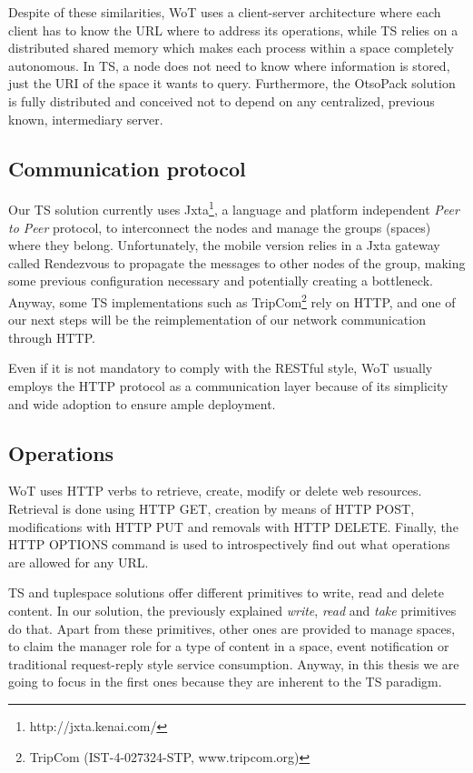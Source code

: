 Despite of these similarities, WoT uses a client-server architecture where each client has to know the URL where to address its operations, while
TS relies on a distributed shared memory which makes each process within a space completely autonomous. In TS, a node does not need to know where
information is stored, just the URI of the space it wants to query. Furthermore, the OtsoPack solution is fully distributed and conceived not to depend
on any centralized, previous known, intermediary server.

\subsection{Communication protocol}
Our TS solution currently uses Jxta\footnote{http://jxta.kenai.com/}, a language and platform independent \textit{Peer to Peer} protocol, to
interconnect the nodes and manage the groups (spaces) where they belong. Unfortunately, the mobile version relies in a Jxta gateway called Rendezvous
to propagate the messages to other nodes of the group, making some previous configuration necessary and potentially creating a bottleneck. Anyway,
some TS implementations such as TripCom\footnote{TripCom (IST-4-027324-STP, www.tripcom.org)} rely on HTTP, and one of our next steps will be the
reimplementation of our network communication through HTTP.

Even if it is not mandatory to comply with the RESTful style, WoT usually employs the HTTP protocol as a communication layer because of its
simplicity and wide adoption to ensure ample deployment.

\subsection{Operations}
WoT uses HTTP verbs to retrieve, create, modify or delete web resources. Retrieval is done using HTTP GET, creation by means of HTTP POST,
modifications with HTTP PUT and removals with HTTP DELETE. Finally, the HTTP OPTIONS command is used to introspectively find out what operations are
allowed for any URL.

TS and tuplespace solutions offer different primitives to write, read and delete content. In our solution, the previously explained \textit{write},
\textit{read} and \textit{take} primitives do that. Apart from these primitives, other ones are provided to manage spaces, to claim the manager role
for a type of content in a space, event notification or traditional request-reply style service consumption. Anyway, in this thesis we are going to focus in the
first ones because they are inherent to the TS paradigm. %

